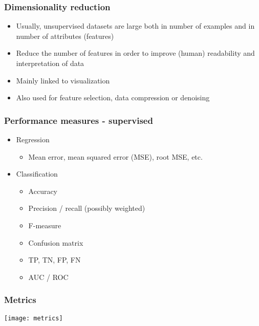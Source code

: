 \begin{frame}[fragile]\frametitle{Dimensionality reduction}
  \begin{itemize}
    \item  Usually, unsupervised datasets are large both in number of examples  and in number of attributes (features)
    \item  Reduce the number of features in order to improve (human) readability and interpretation of data
    \item  Mainly linked to visualization
    \item  Also used for feature selection, data compression or denoising
  \end{itemize}
\end{frame}

\begin{frame}[fragile]\frametitle{Performance measures - supervised}
  \begin{itemize}
    \item  Regression
      \begin{itemize}
    \item   Mean error, mean squared error (MSE), root MSE, etc.
  \end{itemize}
      \item  Classification
      \begin{itemize}
    \item  Accuracy
    \item  Precision / recall (possibly weighted)
    \item  F-measure
    \item  Confusion matrix
    \item  TP, TN, FP, FN
    \item  AUC / ROC
  \end{itemize}
  \end{itemize}
\end{frame}

\begin{frame}[fragile]\frametitle{Metrics}
\begin{center}
\texttt{[image: metrics]}
\end{center}
\end{frame}

